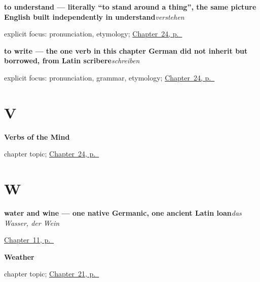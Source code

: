 \noindent\begin{minipage}[t]{\linewidth}
\raggedright
\textbf{to understand — literally \textquotedblleft{}to stand around a thing\textquotedblright{}, the same picture English built independently in understand}\enspace\emph{verstehen}\par
\footnotesize explicit focus: pronunciation, etymology; \hyperref[ch:ge-mind-verbs]{Chapter~24, p.~\pageref*{ch:ge-mind-verbs}}
\end{minipage}\par\smallskip

\noindent\begin{minipage}[t]{\linewidth}
\raggedright
\textbf{to write — the one verb in this chapter German did not inherit but borrowed, from Latin scribere}\enspace\emph{schreiben}\par
\footnotesize explicit focus: pronunciation, grammar, etymology; \hyperref[ch:ge-mind-verbs]{Chapter~24, p.~\pageref*{ch:ge-mind-verbs}}
\end{minipage}\par\smallskip

\section*{V}

\noindent\begin{minipage}[t]{\linewidth}
\raggedright
\textbf{Verbs of the Mind}\par
\footnotesize chapter topic; \hyperref[ch:ge-mind-verbs]{Chapter~24, p.~\pageref*{ch:ge-mind-verbs}}
\end{minipage}\par\smallskip

\section*{W}

\noindent\begin{minipage}[t]{\linewidth}
\raggedright
\textbf{water and wine — one native Germanic, one ancient Latin loan}\enspace\emph{das Wasser, der Wein}\par
\footnotesize \hyperref[ch:food]{Chapter~11, p.~\pageref*{ch:food}}
\end{minipage}\par\smallskip

\noindent\begin{minipage}[t]{\linewidth}
\raggedright
\textbf{Weather}\par
\footnotesize chapter topic; \hyperref[ch:ge-weather]{Chapter~21, p.~\pageref*{ch:ge-weather}}
\end{minipage}\par\smallskip

